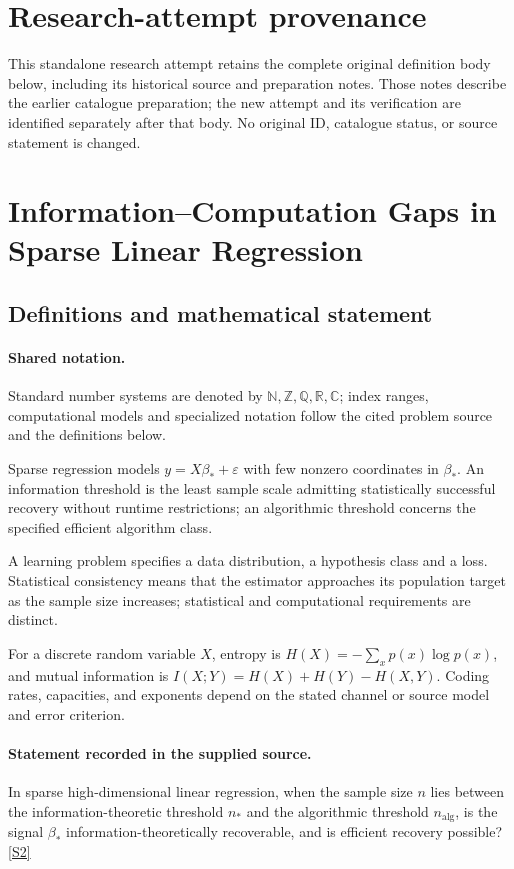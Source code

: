 \documentclass[11pt]{article}
\begin{document}
\section*{Research-attempt provenance}
This standalone research attempt retains the complete original definition body below,
including its historical source and preparation notes. Those notes describe the
earlier catalogue preparation; the new attempt and its verification are identified
separately after that body. No original ID, catalogue status, or source statement is changed.

\section{Information–Computation Gaps in Sparse Linear Regression}\label{statement}

\subsection{Definitions and mathematical statement}

\paragraph{Shared notation.}Standard number systems are denoted by $\mathbb N,\mathbb Z,\mathbb Q,\mathbb R,\mathbb C$; index ranges, computational models and specialized notation follow the cited problem source and the definitions below.


Sparse regression models $y=X\beta_*+\varepsilon$ with few nonzero coordinates in $\beta_*$. An information threshold is the least sample scale admitting statistically successful recovery without runtime restrictions; an algorithmic threshold concerns the specified efficient algorithm class.

A learning problem specifies a data distribution, a hypothesis class and a loss. Statistical consistency means that the estimator approaches its population target as the sample size increases; statistical and computational requirements are distinct.

For a discrete random variable $X$, entropy is $H(X)=-\sum_xp(x)\log p(x)$, and mutual information is $I(X;Y)=H(X)+H(Y)-H(X,Y)$. Coding rates, capacities, and exponents depend on the stated channel or source model and error criterion.
\paragraph{Statement recorded in the supplied source.}
In sparse high-dimensional linear regression, when the sample size $n$ lies between the information-theoretic threshold $n_*$ and the algorithmic threshold $n_{\mathrm{alg}}$, is the signal $\beta_*$ information-theoretically recoverable, and is efficient recovery possible? \href{https://doi.org/10.4171/owr/2017/57}{[S2]}
\end{document}
